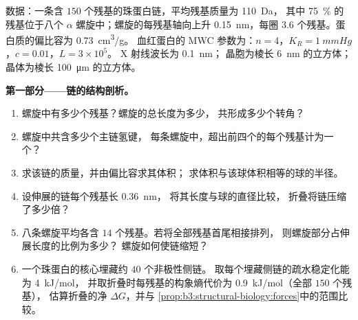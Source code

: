 \begin{problem}
\label{pb:b3:structural-biology:1}
数据：一条含 $150$ 个残基的珠蛋白链，平均残基质量为 \qty{110}{Da}，
其中 \qty{75}{\%} 的残基位于八个 $\alpha$ 螺旋中；螺旋的每残基轴向上升
\qty{0.15}{nm}，每圈 $3.6$ 个残基。蛋白质的偏比容为 \qty{0.73}{cm^3/g}。
血红蛋白的 MWC 参数为：$n = 4$，$K_{R} = \qty{1}{mmHg}$，$c = 0.01$，$L = 3\times 10^{5}$。
X 射线波长为 \qty{0.1}{nm}；
晶胞为棱长 \qty{6}{nm} 的立方体；
晶体为棱长 \qty{100}{\micro m} 的立方体。

\medskip
\noindent\textbf{第一部分——链的结构剖析。}
\begin{enumerate}
  \item 螺旋中有多少个残基？螺旋的总长度为多少，
        共形成多少个转角？
  \item 螺旋中共含多少个主链氢键，
        每条螺旋中，超出前四个的每个残基计为一个？
  \item 求该链的质量，并由偏比容求其体积；
        求体积与该球体积相等的球的半径。
  \item 设伸展的链每个残基长 \qty{0.36}{nm}，
        将其长度与球的直径比较，
        折叠将链压缩了多少倍？
  \item 八条螺旋平均各含 $14$ 个残基。若将全部残基首尾相接排列，
        则螺旋部分占伸展长度的比例为多少？
        螺旋如何使链缩短？
  \item 一个珠蛋白的核心埋藏约 $40$ 个非极性侧链。
        取每个埋藏侧链的疏水稳定化能为 \qty{4}{kJ/mol}，
        并取折叠时每残基的构象熵代价为
        \qty{0.9}{kJ/mol}（全部 $150$ 个残基），
        估算折叠的净 $\Delta G$，并与
        \cref{prop:b3:structural-biology:forces}中的范围比较。
\end{enumerate}


\end{problem}
